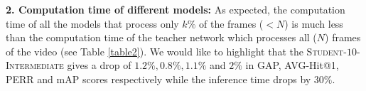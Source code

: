 \documentclass[10pt,twocolumn,letterpaper]{article}
\newcommand{\Model}{\textsc{TeaStud}\xspace}
\newcommand{\inter}[1]{\textsc{Student-}$#1$\textsc{-Intermediate}}
\begin{document}
\noindent\textbf{2. Computation time of different models:} 
As expected, the computation time of all the models that process only $k \%$ of the frames ($<N$) is much less than the computation time of the teacher network which processes all ($N$) frames of the video (see Table \ref{table2}). We would like to highlight that the \inter{10} gives a drop of $1.2 \%, 0.8 \%, 1.1\%$ and $2 \%$ in GAP, AVG-Hit@1, PERR and mAP scores respectively while the inference time drops by $30\%$.

\end{document}
